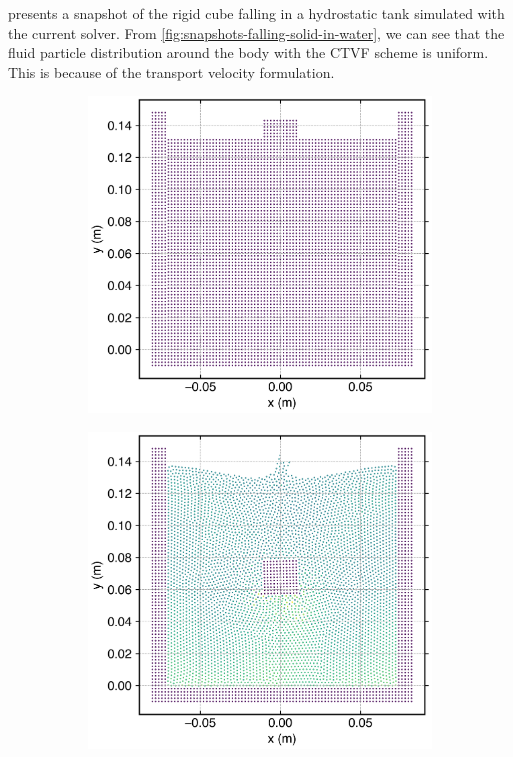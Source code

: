  presents a snapshot of the rigid
cube falling in a hydrostatic tank simulated with the current solver. From
\cref{fig:snapshots-falling-solid-in-water}, we can see that the fluid particle
distribution around the body with the CTVF scheme is uniform. This is because of
the transport velocity formulation.
\begin{figure}[!htpb]
  \centering
  \begin{subfigure}{0.48\textwidth}
    \centering
    \includegraphics[width=1.0\textwidth]{figures/rfc/figures/qiu_2017_falling_solid_in_water_2d/dx_0_002/time0}
  \end{subfigure}
  \begin{subfigure}{0.48\textwidth}
    \centering
    \includegraphics[width=1.0\textwidth]{figures/rfc/figures/qiu_2017_falling_solid_in_water_2d/dx_0_002/time1}
  \end{subfigure}


\end{figure}

